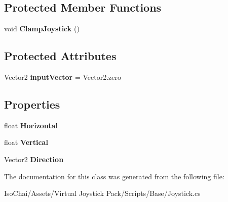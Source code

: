 \subsection*{Protected Member Functions}
\begin{DoxyCompactItemize}
\item 
\mbox{\label{class_joystick_a1a25fbacf5d6c6275abda7f8c29d0e0c}} 
void {\bfseries Clamp\+Joystick} ()
\end{DoxyCompactItemize}
\subsection*{Protected Attributes}
\begin{DoxyCompactItemize}
\item 
\mbox{\label{class_joystick_a8b1dd8b1874e78a0a2781a847c2cd768}} 
Vector2 {\bfseries input\+Vector} = Vector2.\+zero
\end{DoxyCompactItemize}
\subsection*{Properties}
\begin{DoxyCompactItemize}
\item 
\mbox{\label{class_joystick_aa96a7d4d3f9c4b3d79747b0fb4a0d4f7}} 
float {\bfseries Horizontal}
\item 
\mbox{\label{class_joystick_aaa4ab10e8e5f17095b192a64eb3f65c9}} 
float {\bfseries Vertical}
\item 
\mbox{\label{class_joystick_a7c7c6bc3ace9d2014e2b7f8234e979ea}} 
Vector2 {\bfseries Direction}
\end{DoxyCompactItemize}


The documentation for this class was generated from the following file\+:\begin{DoxyCompactItemize}
\item 
Iso\+Chai/\+Assets/\+Virtual Joystick Pack/\+Scripts/\+Base/Joystick.\+cs\end{DoxyCompactItemize}
